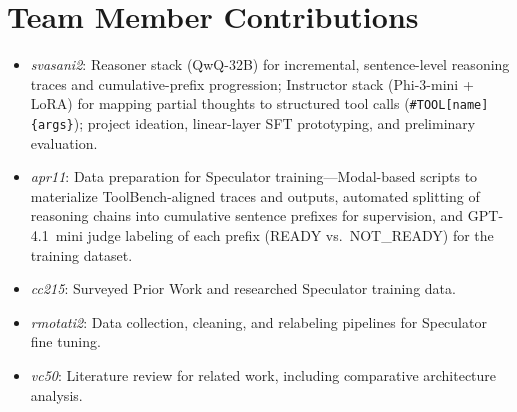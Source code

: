 \documentclass[letterpaper,twocolumn,10pt]{article}
\begin{document}
\section{Team Member Contributions}
\begin{itemize}
\item \emph{svasani2}: Reasoner stack (QwQ-32B) for incremental, sentence-level reasoning traces and cumulative-prefix progression; Instructor stack (Phi-3-mini + LoRA) for mapping partial thoughts to structured tool calls (\texttt{\#TOOL[name]\{args\}}); project ideation, linear-layer SFT prototyping, and preliminary evaluation.
\item \emph{apr11}: Data preparation for Speculator training---Modal-based scripts to materialize ToolBench-aligned traces and outputs, automated splitting of reasoning chains into cumulative sentence prefixes for supervision, and GPT-4.1~mini judge labeling of each prefix (READY vs.\ NOT\_READY) for the training dataset.
\item \emph{cc215}: Surveyed Prior Work and researched Speculator training data.
\item \emph{rmotati2}: Data collection, cleaning, and relabeling pipelines for Speculator fine tuning.
\item \emph{vc50}: Literature review for related work, including comparative architecture analysis.
\end{itemize}


\clearpage
\nocite{*}

\end{document}
